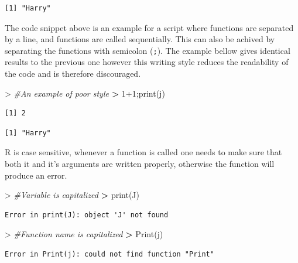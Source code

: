 \documentclass[
]{book}
\newenvironment{Shaded}{\begin{snugshade}}{\end{snugshade}}
\newcommand{\CommentTok}[1]{\textcolor[rgb]{0.56,0.35,0.01}{\textit{#1}}}
\newcommand{\DecValTok}[1]{\textcolor[rgb]{0.00,0.00,0.81}{#1}}
\newcommand{\ErrorTok}[1]{\textcolor[rgb]{0.64,0.00,0.00}{\textbf{#1}}}
\newcommand{\FunctionTok}[1]{\textcolor[rgb]{0.00,0.00,0.00}{#1}}
\newcommand{\NormalTok}[1]{#1}
\newcommand{\SpecialCharTok}[1]{\textcolor[rgb]{0.00,0.00,0.00}{#1}}
\theoremstyle{definition}
\theoremstyle{definition}
\theoremstyle{definition}
\theoremstyle{definition}
\theoremstyle{remark}
\begin{document}
\begin{verbatim}
[1] "Harry"
\end{verbatim}

The code snippet above is an example for a script where functions are separated by a line, and functions are called
sequentially. This can also be achived by separating the functions with semicolon (\texttt{;}).
The example bellow gives identical results to the previous one however this writing style reduces the readability of the
code and is therefore discouraged.

\begin{Shaded}
\begin{Highlighting}[]
\SpecialCharTok{\textgreater{}} \CommentTok{\#An example of poor style}
\ErrorTok{\textgreater{}} \DecValTok{1}\SpecialCharTok{+}\DecValTok{1}\NormalTok{;}\FunctionTok{print}\NormalTok{(j)}
\end{Highlighting}
\end{Shaded}

\begin{verbatim}
[1] 2
\end{verbatim}

\begin{verbatim}
[1] "Harry"
\end{verbatim}

R is case sensitive, whenever a function is called one needs to make sure that
both it and it's arguments are written properly, otherwise the function will produce an error.

\begin{Shaded}
\begin{Highlighting}[]
\SpecialCharTok{\textgreater{}} \CommentTok{\#Variable is capitalized}
\ErrorTok{\textgreater{}} \FunctionTok{print}\NormalTok{(J)}
\end{Highlighting}
\end{Shaded}

\begin{verbatim}
Error in print(J): object 'J' not found
\end{verbatim}

\begin{Shaded}
\begin{Highlighting}[]
\SpecialCharTok{\textgreater{}} \CommentTok{\#Function name is capitalized}
\ErrorTok{\textgreater{}} \FunctionTok{Print}\NormalTok{(j)}
\end{Highlighting}
\end{Shaded}

\begin{verbatim}
Error in Print(j): could not find function "Print"
\end{verbatim}
\end{document}
